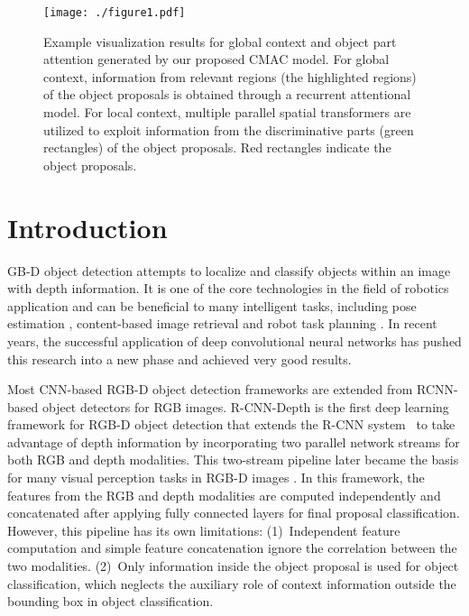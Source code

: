 \documentclass[journal]{IEEEtran}
\begin{document}
\IEEEpeerreviewmaketitle

\begin{figure*}
  \centering
  \texttt{[image: ./figure1.pdf]}
  \caption{\label{figure:1} Example visualization results for global context and object part attention generated by our proposed CMAC model. For global context, information from relevant regions (the highlighted regions) of the object proposals is obtained through a recurrent attentional model. For local context, multiple parallel spatial transformers are utilized to exploit information from the discriminative parts (green rectangles) of the object proposals. Red rectangles indicate the object proposals.}
\end{figure*}


\section{Introduction}
GB-D object detection attempts to localize and classify objects within an image with depth information. It is one of the core technologies in the field of robotics application and can be beneficial to many intelligent tasks, including pose estimation \cite{hinterstoisser2012model, wang2016human}, content-based image retrieval \cite{wu2014hierarchical} and robot task planning \cite{schuster2015generating}. In recent years, the successful application of deep convolutional neural networks has pushed this research into a new phase and achieved very good results.

Most CNN-based RGB-D object detection frameworks are extended from RCNN-based object detectors \cite{girshick2014rich, fast-rcnn, ren2015faster} for RGB images. R-CNN-Depth \cite{gupta2014learning} is the first deep learning framework for RGB-D object detection that extends the R-CNN system~\cite{girshick2014rich} to take advantage of depth information by incorporating two parallel network streams for both RGB and depth modalities. %
 This two-stream pipeline later became the basis for many visual perception tasks in RGB-D images \cite{eitel2015multimodal, gupta2016cross, schwarz2015rgb, li2016lstm}. In this framework, the features from the RGB and depth modalities are computed independently and concatenated after applying fully connected layers for final proposal classification. However, this pipeline has its own limitations: (1)~Independent feature computation and simple feature concatenation ignore the correlation between the two modalities. (2)~Only information inside the object proposal is used for object classification, which neglects the auxiliary role of context information outside the bounding box in object classification.
\end{document}
